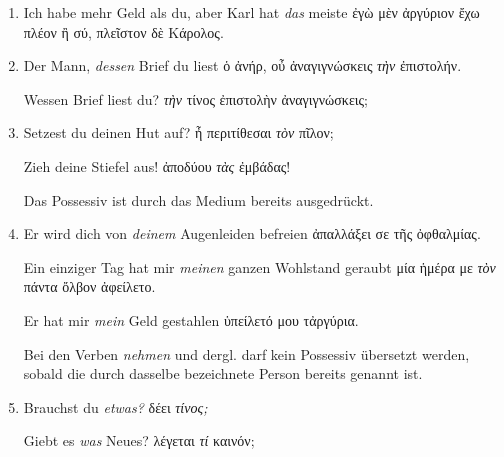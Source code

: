 \begin{enumerate}[leftmargin=0pt,rightmargin=0pt,listparindent =1cm,labelindent=1cm,labelsep=1ex,labelwidth={*},itemindent={*},align=left]
\item Ich habe mehr Geld als du, aber Karl hat \emph{das} meiste \textgreek[variant=ancient]{ἐγὼ
μὲν ἀργύριον ἔχω πλέον ἢ σύ, πλεῖστον δὲ Κάρολος.}
\item Der Mann, \emph{dessen} Brief du liest \textgreek[variant=ancient]{ὁ
ἀνήρ, οὖ ἀναγιγνώσκεις \emph{τὴν} ἐπιστολήν.}


\begin{continuousitemline}Wessen Brief liest du? \textgreek[variant=ancient]{\emph{τὴν}
τίνος ἐπιστολὴν ἀναγιγνώσκεις;}\par\end{continuousitemline}

\item Setzest du deinen Hut auf? \textgreek[variant=ancient]{ἦ περιτίθεσαι
\emph{τὸν} πῖλον;}


\begin{continuousitemline}Zieh deine Stiefel aus! \textgreek[variant=ancient]{ἀποδύου
\emph{τὰς} ἐμβάδας!}\par\end{continuousitemline}


Das Possessiv ist durch das Medium bereits ausgedrückt. 

\item Er wird dich von \emph{deinem} Augenleiden befreien \textgreek[variant=ancient]{ἀπαλλάξει
σε τῆς ὀφθαλμίας.}


\begin{continuousitemline}Ein einziger Tag hat mir \emph{meinen}
ganzen Wohlstand geraubt \textgreek[variant=ancient]{μία ἡμέρα με
\emph{τὸν} πάντα ὄλβον ἀφείλετο.}


Er hat mir \emph{mein} Geld gestahlen \textgreek[variant=ancient]{ὑπείλετό
μου τἀργύρια.}\par\end{continuousitemline}


Bei den Verben \emph{nehmen} und dergl. darf kein Possessiv übersetzt
werden, sobald die durch dasselbe bezeichnete Person bereits genannt
ist.

\item Brauchst du \emph{etwas?} \textgreek[variant=ancient]{δέει \emph{τίνος;}}


\begin{continuousitemline}Giebt es \emph{was} Neues? \textgreek[variant=ancient]{λέγεται
\emph{τί} καινόν;}\par\end{continuousitemline}


\end{enumerate}

